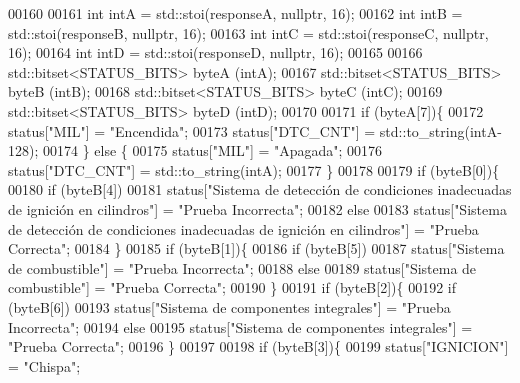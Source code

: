 \begin{DoxyCode}
00160     
00161     \textcolor{keywordtype}{int} intA = std::stoi(responseA, \textcolor{keyword}{nullptr}, 16);
00162     \textcolor{keywordtype}{int} intB = std::stoi(responseB, \textcolor{keyword}{nullptr}, 16);
00163     \textcolor{keywordtype}{int} intC = std::stoi(responseC, \textcolor{keyword}{nullptr}, 16);
00164     \textcolor{keywordtype}{int} intD = std::stoi(responseD, \textcolor{keyword}{nullptr}, 16);
00165     
00166     std::bitset<STATUS\_BITS> byteA (intA);
00167     std::bitset<STATUS\_BITS> byteB (intB);
00168     std::bitset<STATUS\_BITS> byteC (intC);
00169     std::bitset<STATUS\_BITS> byteD (intD);
00170 
00171     \textcolor{keywordflow}{if} (byteA[7])\{
00172         status[\textcolor{stringliteral}{"MIL"}] = \textcolor{stringliteral}{"Encendida"};
00173         status[\textcolor{stringliteral}{"DTC\_CNT"}] = std::to\_string(intA-128);
00174     \} \textcolor{keywordflow}{else} \{
00175         status[\textcolor{stringliteral}{"MIL"}] = \textcolor{stringliteral}{"Apagada"};
00176         status[\textcolor{stringliteral}{"DTC\_CNT"}] = std::to\_string(intA);
00177     \}
00178 
00179     \textcolor{keywordflow}{if} (byteB[0])\{
00180         \textcolor{keywordflow}{if} (byteB[4])
00181             status[\textcolor{stringliteral}{"Sistema de detección de condiciones inadecuadas de ignición en cilindros"}] = \textcolor{stringliteral}{"Prueba
       Incorrecta"};
00182         \textcolor{keywordflow}{else}
00183             status[\textcolor{stringliteral}{"Sistema de detección de condiciones inadecuadas de ignición en cilindros"}] = \textcolor{stringliteral}{"Prueba
       Correcta"};
00184     \}
00185     \textcolor{keywordflow}{if} (byteB[1])\{
00186         \textcolor{keywordflow}{if} (byteB[5])
00187             status[\textcolor{stringliteral}{"Sistema de combustible"}] = \textcolor{stringliteral}{"Prueba Incorrecta"};
00188         \textcolor{keywordflow}{else}
00189             status[\textcolor{stringliteral}{"Sistema de combustible"}] = \textcolor{stringliteral}{"Prueba Correcta"};
00190     \}
00191     \textcolor{keywordflow}{if} (byteB[2])\{
00192         \textcolor{keywordflow}{if} (byteB[6])
00193             status[\textcolor{stringliteral}{"Sistema de componentes integrales"}] = \textcolor{stringliteral}{"Prueba Incorrecta"};
00194         \textcolor{keywordflow}{else}
00195             status[\textcolor{stringliteral}{"Sistema de componentes integrales"}] = \textcolor{stringliteral}{"Prueba Correcta"};
00196     \}
00197 
00198     \textcolor{keywordflow}{if} (byteB[3])\{
00199         status[\textcolor{stringliteral}{"IGNICION"}] = \textcolor{stringliteral}{"Chispa"};

\end{DoxyCode}
